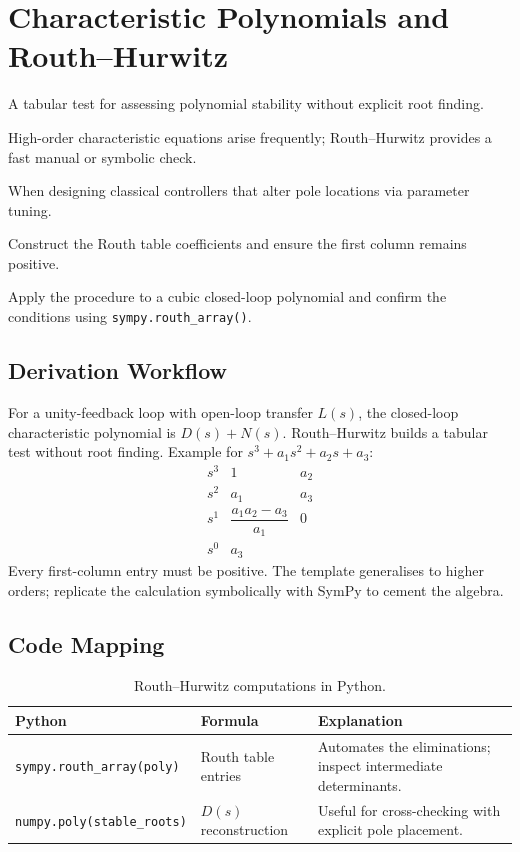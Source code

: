 \section{Characteristic Polynomials and Routh--Hurwitz}
\begin{beginnerguide}
    \item[\textbf{What?}] A tabular test for assessing polynomial stability without explicit root finding.
    \item[\textbf{Why?}] High-order characteristic equations arise frequently; Routh--Hurwitz provides a fast manual or symbolic check.
    \item[\textbf{When?}] When designing classical controllers that alter pole locations via parameter tuning.
    \item[\textbf{How?}] Construct the Routh table coefficients and ensure the first column remains positive.
    \item[\textbf{Example}] Apply the procedure to a cubic closed-loop polynomial and confirm the conditions using \texttt{sympy.routh\_array()}.
\end{beginnerguide}
\subsection{Derivation Workflow}
For a unity-feedback loop with open-loop transfer $L(s)$, the closed-loop characteristic polynomial is $D(s) + N(s)$. Routh--Hurwitz builds a tabular test without root finding. Example for $s^3 + a_1 s^2 + a_2 s + a_3$:
\[
\begin{array}{c|cc}
s^3 & 1 & a_2 \\
s^2 & a_1 & a_3 \\
s^1 & \dfrac{a_1 a_2 - a_3}{a_1} & 0 \\
s^0 & a_3 & 
\end{array}
\]
Every first-column entry must be positive. The template generalises to higher orders; replicate the calculation symbolically with SymPy to cement the algebra.

\subsection{Code Mapping}
\begin{table}[h]
    \centering
    \small
    \renewcommand{\arraystretch}{1.2}
    \begin{tabularx}{\linewidth}{|>{\raggedright\arraybackslash}p{4cm}|X|X|}
        \hline
        \textbf{Python} & \textbf{Formula} & \textbf{Explanation} \\
        \hline
        \texttt{sympy.routh\_array(poly)} & Routh table entries & Automates the eliminations; inspect intermediate determinants. \\
        \hline
        \texttt{numpy.poly(stable\_roots)} & $D(s)$ reconstruction & Useful for cross-checking with explicit pole placement. \\
        \hline
    \end{tabularx}
    \caption{Routh--Hurwitz computations in Python.}
\end{table}

